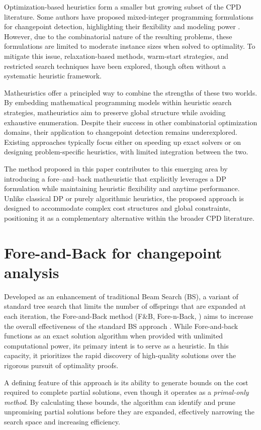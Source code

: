 \documentclass[runningheads]{llncs}
\begin{document}
Optimization-based heuristics form a smaller but growing subset of the CPD literature. Some authors have proposed mixed-integer programming formulations for changepoint detection, highlighting their flexibility and modeling power \cite{M24}. However, due to the combinatorial nature of the resulting problems, these formulations are limited to moderate instance sizes when solved to optimality. To mitigate this issue, relaxation-based methods, warm-start strategies, and restricted search techniques have been explored, though often without a systematic heuristic framework.

Matheuristics offer a principled way to combine the strengths of these two worlds. By embedding mathematical programming models within heuristic search strategies, matheuristics aim to preserve global structure while avoiding exhaustive enumeration. Despite their success in other combinatorial optimization domains, their application to changepoint detection remains underexplored. Existing approaches typically focus either on speeding up exact solvers or on designing problem-specific heuristics, with limited integration between the two.

The method proposed in this paper contributes to this emerging area by introducing a fore–and–back matheuristic that explicitly leverages a DP formulation while maintaining heuristic flexibility and anytime performance. Unlike classical DP or purely algorithmic heuristics, the proposed approach is designed to accommodate complex cost structures and global constraints, positioning it as a complementary alternative within the broader CPD literature.

\section{Fore-and-Back for changepoint analysis}	\label{sec:forenback}
Developed as an enhancement of traditional Beam Search (BS), a variant of standard tree  search that limits the number of offsprings that are expanded at each iteration, the Fore-and-Back method (F\&B, Fore-n-Back, \cite{BMM08,the_book}) aims to increase the overall effectiveness of the standard BS approach \cite{L76,N89,B08}. While Fore-and-back functions as an exact solution algorithm when provided with unlimited computational power, its primary intent is to serve as a heuristic. In this capacity, it prioritizes the rapid discovery of high-quality solutions over the rigorous pursuit of optimality proofs.

A defining feature of this approach is its ability to generate bounds on the cost required to complete partial solutions, even though it operates as a {\it primal-only method}. By calculating these bounds, the algorithm can identify and prune unpromising partial solutions before they are expanded, effectively narrowing the search space and increasing efficiency.
\end{document}
